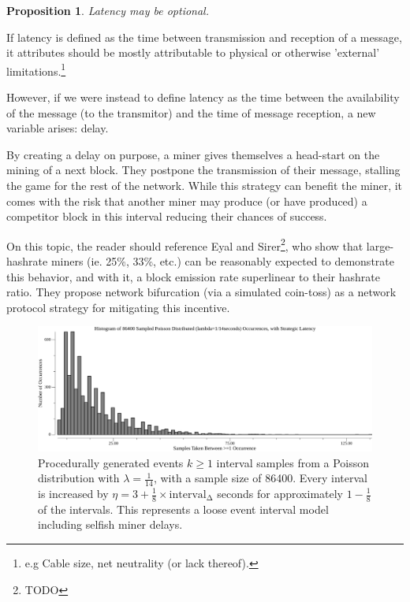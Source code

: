 \documentclass[11pt]{article}
\theoremstyle{plain}
\newtheorem{proposition}{Proposition}[section]
\begin{document}
\vspace{5mm}
\begin{proposition}
  Latency may be optional.
\end{proposition}

If latency is defined as the time between transmission and reception of a
message, it attributes should be mostly attributable to physical or
otherwise 'external' limitations.\nolinebreak\footnote{
e.g Cable size, net neutrality (or lack thereof).
}

However, if we were instead to define latency as the time between the availability
of the message (to the transmitor) and the time of message reception,
a new variable arises: delay.

By creating a delay on purpose, a miner gives themselves a head-start
on the mining of a next block. They postpone the transmission of their message,
stalling the game for the rest of the network. While this strategy can benefit
the miner, it comes with the risk that another miner may produce (or have
produced) a competitor block in this interval reducing their chances of success.

On this topic, the reader should reference Eyal and Sirer\footnote{TODO}, who
show that large-hashrate miners (ie. 25\%, 33\%, etc.) can be reasonably
expected to demonstrate this behavior, and with it, a block emission
rate superlinear to their hashrate ratio. They propose network bifurcation
(via a simulated coin-toss) as a network protocol strategy for mitigating
this incentive.

\begin{figure}[tph]
    \centering

    \includegraphics[width=1.0\textwidth]{go-block-step/out/vis_poisson_samples_eventintervals_latencysamesamestrat_hist.png}
    \caption{
        Procedurally generated events $k \geq 1$ interval samples from a Poisson distribution
        with $\lambda = \frac{1}{14}$, with a sample size of 86400.
        Every interval is increased by $\eta=3 + \frac{1}{8} \times \mathrm{interval_{\Delta}}$ seconds for approximately
        $1-\frac{1}{8}$ of the intervals.
        This represents a loose event interval model including selfish miner delays.
    }
\end{figure}
\end{document}
